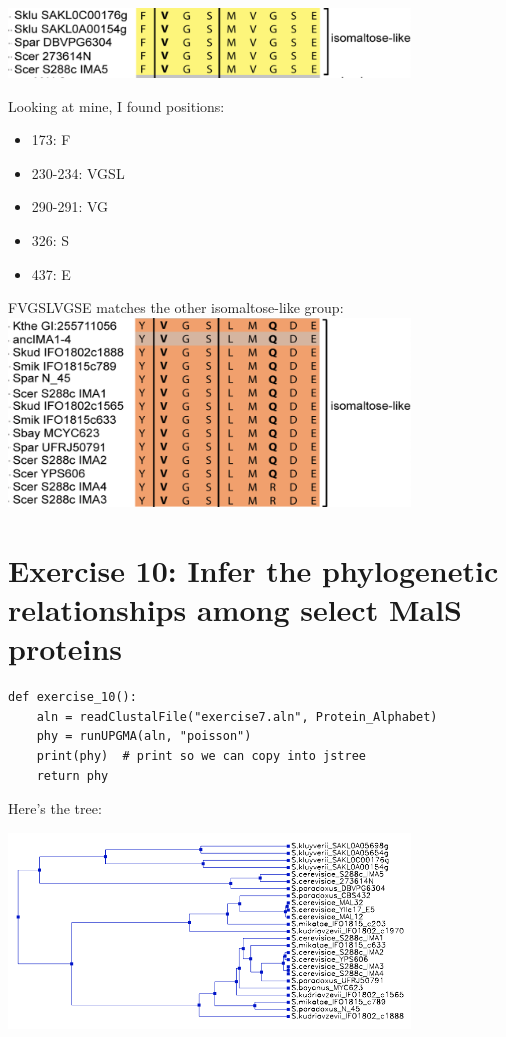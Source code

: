 \documentclass{article} %
\begin{document}
\includegraphics[width=0.8\textwidth]{ima1.png}

\par Looking at mine, I found positions: \\

\begin{itemize}
    \item 173: F
    \item 230-234: VGSL
    \item 290-291: VG
    \item 326: S
    \item 437: E
\end{itemize}

FVGSLVGSE matches the other isomaltose-like group: \\

\includegraphics[width=0.8\textwidth]{mine.png}

\section{Exercise 10: Infer the phylogenetic relationships among select MalS proteins}

\begin{verbatim}
def exercise_10():
    aln = readClustalFile("exercise7.aln", Protein_Alphabet)
    phy = runUPGMA(aln, "poisson")
    print(phy)  # print so we can copy into jstree
    return phy
\end{verbatim}

Here's the tree:

\includegraphics[width=0.8\textwidth]{tree.png}
\end{document}
